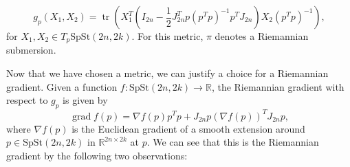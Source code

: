 \begin{equation}\label{eq:spst_metric}
    g_{p}(X_{1},X_{2})=\operatorname{tr}\left(X_{1}^{T}\left(I_{2n}- \frac{1}{2}J_{2n}^{T}p(p^{T}p)^{-1}p^{T}J_{2n}\right)X_{2}(p^{T}p)^{-1}\right),
\end{equation}
for $X_{1},X_{2}\in T_{p}\mathrm{SpSt}(2n, 2k)$. For this metric, $\pi$ denotes a Riemannian submersion.

Now that we have chosen a metric, we can justify a choice for a Riemannian gradient. Given a function $f:\mathrm{SpSt}(2n, 2k)\xrightarrow{}\mathbb{R}$, the Riemannian gradient with respect to $g_{p}$ is given by
$$\operatorname{grad}f(p)=\nabla f(p)p^{T}p+J_{2n}p(\nabla f(p))^{T}J_{2n}p,$$
where $\nabla f(p)$ is the Euclidean gradient of a smooth extension around $p\in \mathrm{SpSt}(2n, 2k)$ in $\mathbb{R}^{2n\times2k}$ at $p$. We can see that this is the Riemannian gradient by the following two observations:  